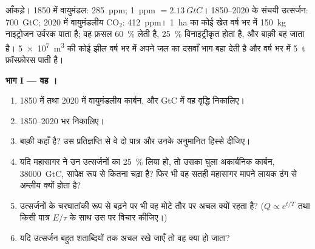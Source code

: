 \begin{problem}
\label{pb:b2:biogeochemical-cycles:1}
आँकड़े। 1850 में वायुमंडल: \qty{285}{ppm}; \qty{1}{ppm} $=
\qty{2.13}{GtC}$। 1850--2020 के संचयी उत्सर्जन: \qty{700}{GtC};
2020 में वायुमंडलीय $\mathrm{CO_2}$: \qty{412}{ppm}। \qty{1}{ha} का कोई खेत
वर्ष भर में \qty{150}{kg} नाइट्रोजन उर्वरक पाता है;
वह फ़सल \qty{60}{\%} लेती है, \qty{25}{\%} विनाइट्रीकृत होता है, और
बाक़ी बह जाता है। \qty{5e7}{m^3} की कोई झील वर्ष भर में अपने जल का दसवाँ भाग
बहा देती है और वर्ष भर में \qty{5}{t} फ़ॉस्फ़ोरस पाती है।

\medskip
\noindent\textbf{भाग I --- वह ।}
\begin{enumerate}
  \item 1850 में तथा 2020 में वायुमंडलीय कार्बन, और GtC में वह
        वृद्धि निकालिए।
  \item 1850--2020 भर  निकालिए।
  \item बाक़ी कहाँ है? उस प्रतिज्ञप्ति से वे दो पात्र और उनके
        अनुमानित हिस्से दीजिए।
  \item यदि महासागर ने उन उत्सर्जनों का \qty{25}{\%} लिया हो, तो उसका
        घुला अकार्बनिक कार्बन, \qty{38000}{GtC}, सापेक्ष रूप से कितना
        चढ़ा है? फिर भी वह सतही महासागर मापने लायक ढंग से
        अम्लीय क्यों होता है?
  \item उत्सर्जनों के चरघातांकी रूप से बढ़ने पर भी वह 
        मोटे तौर पर अचल क्यों रहता है? ($Q \propto e^{t/T}$ तथा
        किसी पात्र $E/\tau$ के साथ उस  पर विचार कीजिए।)
  \item यदि उत्सर्जन बहुत शताब्दियों तक अचल रखे जाएँ तो वह
         क्या हो जाता?
\end{enumerate}


\end{problem}
